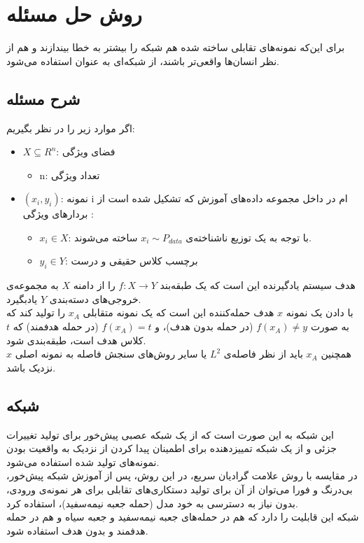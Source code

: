 \chapter{روش حل مسئله}
\thispagestyle{empty}

برای این‌که نمونه‌های تقابلی ساخته شده هم شبکه را بیشتر به خطا بیندازند و هم از نظر انسان‌ها واقعی‌تر باشند، از شبکه‌ای به عنوان
استفاده می‌شود.
\cite{Xiao2018GeneratingAE}

\section{شرح مسئله}
اگر موارد زیر را در نظر بگیریم:
\begin{itemize}
	\item $X \subseteq R^n$:
	فضای ویژگی
	
	\begin{itemize} 
		\item n:
		تعداد ویژگی 
	\end{itemize}

	\item $(x_i, y_i)$:
	نمونه i ام در داخل مجموعه داده‌های آموزش که تشکیل شده است از بردارهای ویژگی
	:
	\begin{itemize}
		\item $x_i \in X$:
		با توجه به یک توزیع ناشناخته‌ی
		$x_i \sim P_{data}$
		ساخته ‌می‌شوند.
		
		\item $y_i \in Y$:
		برچسب کلاس حقیقی و درست
	\end{itemize}
\end{itemize}
هدف سیستم یادگیرنده 
این است که یک طبقه‌بند
$f: X \rightarrow Y$
را از دامنه
$X$
به مجموعه‌ی خروجی‌های دسته‌بندی 
$Y$
یادبگیرد.
\\ 
با دادن یک نمونه 
$x$
هدف حمله‌کننده این است که یک نمونه‌ متقابلی 
$x_A$
را تولید کند که به صورت 
$f(x_A) \neq y$
(در حمله بدون هدف)، و 
$f(x_A) = t$
(در حمله هدفمند) که 
$t$
کلاس هدف است، طبقه‌بندی شود.
\\
همچنین 
$x_A$
باید از نظر فاصله‌ی
$L^2$
یا سایر روش‌های سنجش فاصله به نمونه اصلی
$x$
نزدیک باشد.

\section{شبکه 
}
این شبکه به این صورت است که از یک شبکه عصبی پیش‌خور
برای تولید تغییرات جزئی و از یک شبکه تمییزدهنده برای اطمینان پیدا کردن از نزدیک به واقعیت بودن نمونه‌های تولید شده استفاده می‌شود.
\\
در مقایسه با روش علامت گرادیان سریع، در این روش، پس از آموزش شبکه پیش‌خور، بی‌درنگ و فورا می‌توان از آن برای تولید دستکاری‌های تقابلی برای هر نمونه‌ی ورودی، بدون نیاز به دسترسی به خود مدل (حمله جعبه نیمه‌سفید)، استفاده کرد.
\\
شبکه 
این قابلیت را دارد که هم در حمله‌های جعبه نیمه‌سفید و جعبه سیاه و هم در حمله هدفمند و بدون هدف استفاده شود.

